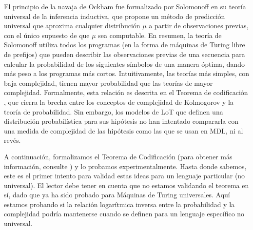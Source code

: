El principio de la navaja de Ockham fue formalizado por Solomonoff \cite{solomonoff1964formal} en su teoría universal de la inferencia inductiva, que propone un método de predicción universal que aproxima cualquier distribución $\mu$ a partir de observaciones previas, con el único supuesto de que $\mu$ sea computable. En resumen, la teoría de Solomonoff utiliza todos los programas (en la forma de máquinas de Turing libre de prefijos)
que pueden describir las observaciones previas de una secuencia para calcular la probabilidad de los siguientes símbolos de una manera óptima, dando más peso a los programas más cortos. Intuitivamente, las teorías más simples, con baja complejidad, tienen mayor probabilidad que las teorías de mayor complejidad. Formalmente, esta relación es descrita en el Teorema de codificación \cite{levin1974laws},  que cierra la brecha entre los conceptos de complejidad de Kolmogorov y la teoría de probabilidad. Sin embargo, los modelos de LoT que definen una distribución probabilística para sus hipótesis no han intentado compararla con una medida de complejidad de las hipótesis como las que se usan en MDL, ni al revés.


A continuación, formalizamos el Teorema de Codificación (para obtener más información, consulte \cite{li2013introduction}) y lo probamos experimentalmente. Hasta donde sabemos, este es el primer intento para validad estas ideas para un lenguaje particular (no universal). El lector debe tener en cuenta que no estamos validando el teorema en sí, dado que ya ha sido probado para Máquinas de Turing universales. Aquí estamos probando si la relación logarítmica inversa entre la probabilidad y la complejidad podría mantenerse cuando se definen para un lenguaje específico no universal.

